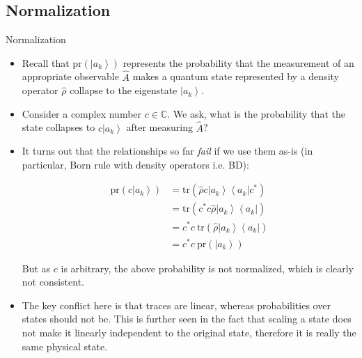 \documentclass[9pt,handout]{beamer}
\newcommand{\pr}[0]{\text{pr}}
\newcommand{\tr}[0]{\text{tr}}
\begin{document}
\subsection{Normalization}
\begin{frame}{Normalization}
\begin{itemize}
\item Recall that $\pr \left( \left\lvert a_k \right\rangle \right)$ represents the probability that the measurement of an appropriate observable $\widehat{A}$ makes a quantum state represented by a density operator $\widehat{\rho}$ collapse to the eigenstate $\left\lvert a_k \right\rangle$.

\item Consider a complex number $c \in \mathbb{C}$. We ask, what is the probability that the state collapses to $c \left\lvert a_k \right\rangle$ after measuring $\widehat{A}$?

\item It turns out that the relationships so far \emph{fail} if we use them as-is (in particular, Born rule with density operators i.e. BD):

\begin{align*}
\pr \left( c \left\lvert a_k \right\rangle \right) & = \tr \left( \widehat{\rho} c \left\lvert a_k \right\rangle \left\langle a_k \right\rvert c^* \right) \\
& = \tr \left( c^* c \widehat{\rho} \left\lvert a_k \right\rangle \left\langle a_k \right\rvert \right) \\
& = c^* c \: \tr \left( \widehat{\rho} \left\lvert a_k \right\rangle \left\langle a_k \right\rvert \right) \\
& = c^* c \: \pr \left( \left\lvert a_k \right\rangle \right)
\end{align*}

But as $c$ is arbitrary, the above probability is not normalized, which is clearly not consistent.

\item The key conflict here is that traces are linear, whereas probabilities over states should not be. This is further seen in the fact that scaling a state does not make it linearly independent to the original state, therefore it is really the same physical state.
\end{itemize}
\end{frame}
\end{document}
